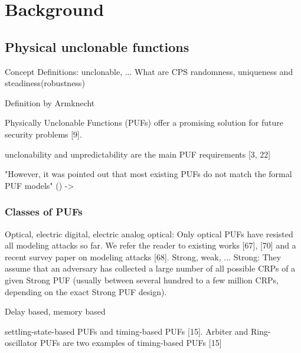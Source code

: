 \chapter{Background}

\section{Physical unclonable functions}
\label{sec:pyhsicalunclonablefunctions}

Concept \cite{Suh2007PhysicalGeneration}
Definitions: unclonable, ...
What are CPS
randomness, uniqueness and steadiness(robustness) \cite{CherifJouini2011PerformanceStatistics}

Definition by Armknecht

Physically Unclonable Functions (PUFs) offer a promising solution for future security problems [9].
\cite{Tajik2014PhysicalPUFs}

unclonability and unpredictability are the main PUF requirements [3, 22]
\cite{Tajik2014PhysicalPUFs}

"However, it was pointed out that most existing PUFs do not match the formal PUF models" (\cite{Becker2015ThePUFs}) -> \cite{Ruhrmair2013PUFsEvaluations}


\subsection{Classes of PUFs}

Optical, electric digital, electric analog
optical: Only optical PUFs have resisted all modeling attacks so far. We refer the reader to existing works [67], [70] and a recent survey paper on modeling attacks [68]. \cite{Ruhrmair2014PUFsGlance}
Strong, weak, ...  
Strong: They assume that an adversary has collected a large number of all possible CRPs of a given Strong PUF (usually between several hundred to a few million CRPs, depending on the exact Strong PUF design). \cite{Ruhrmair2014PUFsGlance}

Delay based, memory based 

settling-state-based PUFs and timing-based PUFs [15].
Arbiter and Ring-oscillator PUFs are two examples of timing-based PUFs [15]
\cite{Tajik2014PhysicalPUFs}

